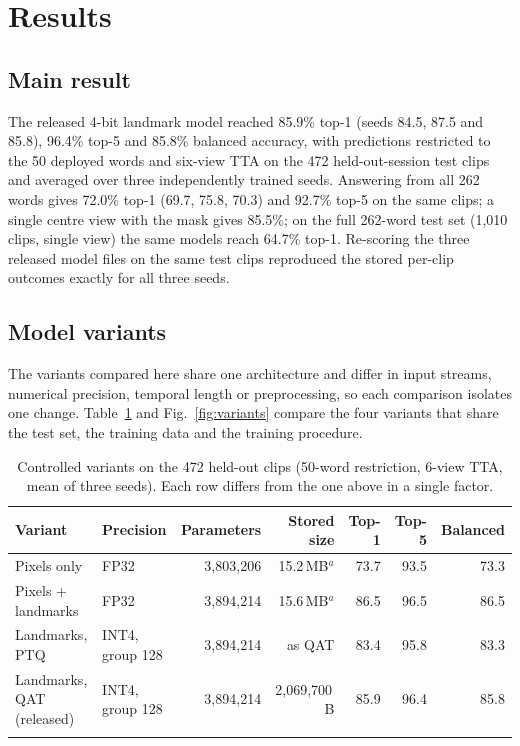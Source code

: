 \documentclass[pdflatex,sn-mathphys-num,twocolumn]{sn-jnl}
\newlength\origtw
\newenvironment{widetable}[1][tbp]{\begin{table}[#1]\centering\begin{minipage}{\origtw}\setlength\textwidth{\origtw}\setlength\columnwidth{\origtw}\begin{center}\begin{threeparttable}\tablebodyfont\renewcommand\footnotetext[2][]{{\removelastskip\vskip3pt\let\tablebodyfont\tablefootnotefont\hskip0pt\if!##1!\else{\smash{$^{##1}$}}\fi##2\par}}}{\end{threeparttable}\end{center}\end{minipage}\end{table}}
\theoremstyle{thmstyleone}%
\begin{document}
\section{Results}\label{sec:results}

\subsection{Main result}\label{sec:res:main}

The released 4-bit landmark model reached 85.9\% top-1 (seeds 84.5, 87.5 and 85.8), 96.4\% top-5 and 85.8\% balanced accuracy, with predictions restricted to the 50 deployed words and six-view TTA on the 472 held-out-session test clips and averaged over three independently trained seeds. Answering from all 262 words gives 72.0\% top-1 (69.7, 75.8, 70.3) and 92.7\% top-5 on the same clips; a single centre view with the mask gives 85.5\%; on the full 262-word test set (1,010 clips, single view) the same models reach 64.7\% top-1. Re-scoring the three released model files on the same test clips reproduced the stored per-clip outcomes exactly for all three seeds.

\subsection{Model variants}\label{sec:res:variants}

The variants compared here share one architecture and differ in input streams, numerical precision, temporal length or preprocessing, so each comparison isolates one change. Table~\ref{tab:variants} and Fig.~\ref{fig:variants} compare the four variants that share the test set, the training data and the training procedure.

\begin{widetable}[t]
\caption{Controlled variants on the 472 held-out clips (50-word restriction, 6-view TTA, mean of three seeds). Each row differs from the one above in a single factor.}\label{tab:variants}
\footnotesize
\setlength{\tabcolsep}{4pt}
\begin{tabular*}{\textwidth}{@{\extracolsep\fill}llrrrrr@{}}
\toprule
Variant & Precision & Parameters & Stored size & Top-1 & Top-5 & Balanced \\
\midrule
Pixels only & FP32 & 3,803,206 & 15.2\,MB$^{a}$ & 73.7 & 93.5 & 73.3 \\
Pixels + landmarks & FP32 & 3,894,214 & 15.6\,MB$^{a}$ & 86.5 & 96.5 & 86.5 \\
Landmarks, PTQ & INT4, group 128 & 3,894,214 & as QAT & 83.4 & 95.8 & 83.3 \\
Landmarks, QAT (released) & INT4, group 128 & 3,894,214 & 2,069,700\,B & 85.9 & 96.4 & 85.8 \\
\botrule
\end{tabular*}
\end{widetable}
\end{document}
